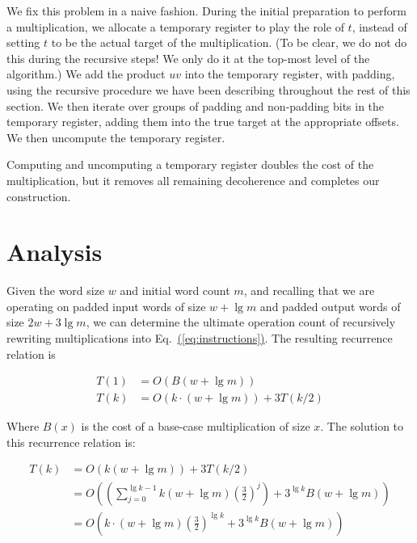 \documentclass[onecolumn]{quantumarticle}
\newcommand{\eq}[1]{Eq.~\hyperref[eq:#1]{(\ref*{eq:#1})}}
\begin{document}
We fix this problem in a naive fashion.
During the initial preparation to perform a multiplication, we allocate a temporary register to play the role of $t$, instead of setting $t$ to be the actual target of the multiplication.
(To be clear, we do not do this during the recursive steps!
We only do it at the top-most level of the algorithm.)
We add the product $uv$ into the temporary register, with padding, using the recursive procedure we have been describing throughout the rest of this section.
We then iterate over groups of padding and non-padding bits in the temporary register, adding them into the true target at the appropriate offsets.
We then uncompute the temporary register.

Computing and uncomputing a temporary register doubles the cost of the multiplication, but it removes all remaining decoherence and completes our construction.


\section{Analysis}
\label{sec:results}

Given the word size $w$ and initial word count $m$, and recalling that we are operating on padded input words of size $w + \lg m$ and padded output words of size $2w + 3 \lg m$, we can determine the ultimate operation count of recursively rewriting multiplications into \eq{instructions}.
The resulting recurrence relation is

\begin{equation}
    \begin{aligned}
        T(1) &= O(B(w + \lg m))
        \\
        T(k) &= O(k \cdot (w + \lg m)) + 3 T(k/2)
    \end{aligned}
\end{equation}

Where $B(x)$ is the cost of a base-case multiplication of size $x$.
The solution to this recurrence relation is:

\begin{equation}
    \begin{aligned}
T(k) &= O(k (w + \lg m)) + 3 T(k/2)
\\   &= O\left(\left(\sum_{j=0}^{\lg k - 1} k (w + \lg m) \left(\frac{3}{2}\right)^j\right) + 3^{\lg k} B(w + \lg m)\right)
\\   &= O\left(k \cdot (w + \lg m) \left(\frac{3}{2}\right)^{\lg k} + 3^{\lg k} B(w + \lg m)\right)
    \end{aligned}
\end{equation}
\end{document}
